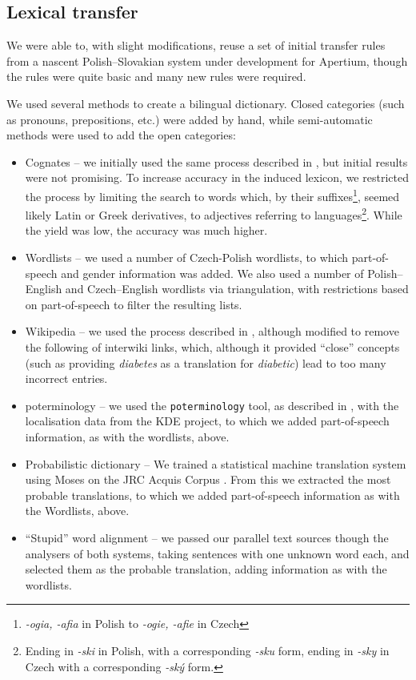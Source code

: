 \documentclass[11pt]{article}
\begin{document}
\subsection{Lexical transfer}

We were able to, with slight modifications, reuse a set of initial
transfer rules from a nascent Polish--Slovakian system under
development for Apertium, though the rules were quite basic
and many new rules were required.

We used several methods to create a bilingual dictionary. Closed 
categories (such as pronouns, prepositions, etc.) were added by
hand, while semi-automatic methods were used to add the open 
categories:

\begin{itemize}
\item Cognates -- we initially used the same process described in \cite{tyers2009rfr}, 
but initial results were not promising. To increase accuracy in the induced lexicon,
we restricted the process by limiting the search to words which, by their 
suffixes\footnote{\emph{-ogia, -afia} in Polish to \emph{-ogie, -afie} in Czech}, 
seemed likely Latin or Greek derivatives, to adjectives referring to 
languages\footnote{Ending in \emph{-ski} in Polish, with a corresponding \emph{-sku} form,
ending in \emph{-sky} in Czech with a corresponding \emph{-ský} form.}. While the
yield was low, the accuracy was much higher.

\item Wordlists -- we used a number of Czech-Polish wordlists, to which part-of-speech 
and gender information was added. We also used a number of Polish--English and Czech--English
wordlists via triangulation, with restrictions based on part-of-speech to filter the
resulting lists.

\item Wikipedia -- we used the process described in \cite{tyers2008}, although modified to
remove the following of interwiki links, which, although it provided ``close'' concepts
(such as providing \emph{diabetes} as a translation for \emph{diabetic}) lead to too
many incorrect entries.

\item poterminology -- we used the {\tt\small poterminology} tool, as described in
\cite{unhammer2009rfr}, with the localisation data from the KDE project, to which
we added part-of-speech information, as with the wordlists, above.

\item Probabilistic dictionary -- We trained a statistical machine translation system
using Moses \citep{Koehn2007} on the JRC Acquis Corpus \citep{Steinberger2006}. From this
we extracted the most probable translations, to which we added part-of-speech information
as with the Wordlists, above.

\item ``Stupid'' word alignment -- we passed our parallel text sources though the
analysers of both systems, taking sentences with one unknown word each, and selected
them as the probable translation, adding information as with the wordlists.
\end{itemize}
\end{document}
